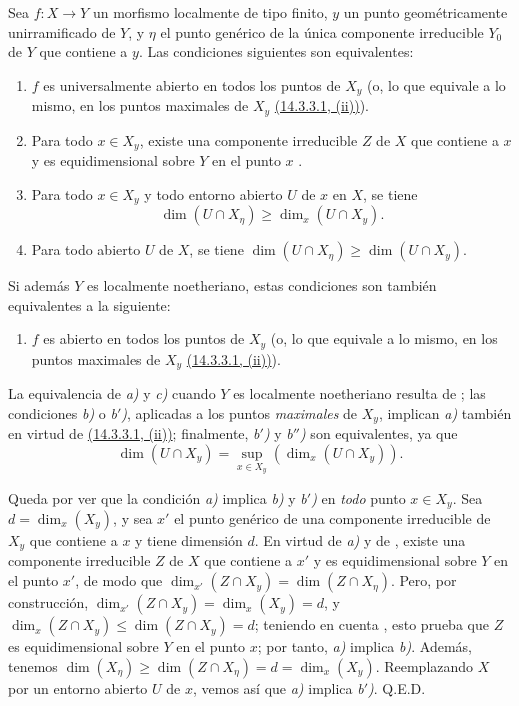 \begin{corollary}[14.4.2]
\label{IV.14.4.2}
Sea $f:X\to Y$ un morfismo localmente de tipo finito, $y$ un punto geométricamente unirramificado de $Y$, y $\eta$ el punto genérico de la única componente irreducible $Y_0$ de $Y$ que contiene a $y$.
Las condiciones siguientes son equivalentes:
\begin{enumerate}[label=\emph{\alph*)}]
  \item $f$ es universalmente abierto en todos los puntos de $X_y$ \textup{(o, lo que equivale a lo mismo, en los puntos maximales de $X_y$ {\hyperlink{ega4.c04.subsec.14-3-3-1}{(14.3.3.1, (ii))}})}.
  \item Para todo $x\in X_y$, existe una componente irreducible $Z$ de $X$ que contiene a $x$ y es equidimensional sobre $Y$ en el punto $x$ .
  \item[\emph{b$'$)}] Para todo $x\in X_y$ y todo entorno abierto $U$ de $x$ en $X$, se tiene
    \[
      \dim(U\cap X_{\eta})\geq\dim_x(U\cap X_y).
    \]
  \item[\emph{b$''$)}] Para todo abierto $U$ de $X$, se tiene $\dim(U\cap X_{\eta})\geq\dim(U\cap X_y)$.
\end{enumerate}
\end{corollary}
Si además $Y$ es localmente noetheriano, estas condiciones son también equivalentes a la siguiente:
\begin{enumerate}[label=\emph{\alph*)}]
  \item[\emph{c)}] $f$ es abierto en todos los puntos de $X_y$ \textup{(o, lo que equivale a lo mismo, en los puntos maximales de $X_y$ {\hyperlink{ega4.c04.subsec.14-3-3-1}{(14.3.3.1, (ii))}})}.
\end{enumerate}
La equivalencia de \emph{a)} y \emph{c)} cuando $Y$ es localmente noetheriano resulta de ; las condiciones \emph{b)} o \emph{b$'$)}, aplicadas a los puntos \emph{maximales} de $X_y$, implican \emph{a)} también en virtud de {\hyperlink{ega4.c04.subsec.14-3-3-1}{(14.3.3.1, (ii))}}; finalmente, \emph{b$'$)} y \emph{b$''$)} son equivalentes, ya que
\[
  \dim(U\cap X_y) = \sup_{x\in X_y}(\dim_x(U\cap X_y)).
\]

Queda por ver que la condición \emph{a)} implica \emph{b)} y \emph{b$'$)} en \emph{todo} punto $x\in X_y$.
Sea $d=\dim_x(X_y)$, y sea $x'$ el punto genérico de una componente irreducible de $X_y$ que contiene a $x$ y tiene dimensión $d$.
En virtud de \emph{a)} y de , existe una componente irreducible $Z$ de $X$ que contiene a $x'$ y es equidimensional sobre $Y$ en el punto $x'$, de modo que $\dim_{x'}(Z\cap X_y)=\dim(Z\cap X_\eta)$.
Pero, por construcción, $\dim_{x'}(Z\cap X_y)=\dim_x(X_y)=d$, y $\dim_x(Z\cap X_y)\leq\dim(Z\cap X_y)=d$; teniendo en cuenta , esto prueba que $Z$ es equidimensional sobre $Y$ en el punto $x$; por tanto, \emph{a)} implica \emph{b)}.
Además, tenemos $\dim(X_\eta)\geq\dim(Z\cap X_\eta)=d=\dim_x(X_y)$.
Reemplazando $X$ por un entorno abierto $U$ de $x$, vemos así que \emph{a)} implica \emph{b$'$)}.
Q.E.D.

